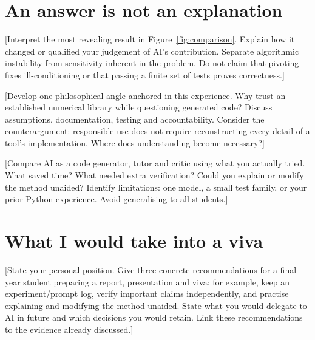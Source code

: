 \documentclass[11pt,a4paper]{article}
\begin{document}
\newpage
\section*{An answer is not an explanation}
[Interpret the most revealing result in Figure~\ref{fig:comparison}.
Explain how it changed or qualified your judgement of AI's contribution.
Separate algorithmic instability from sensitivity inherent in the problem.
Do not claim that pivoting fixes ill-conditioning or that passing a finite
set of tests proves correctness.]

[Develop one philosophical angle anchored in this experience. Why trust an
established numerical library while questioning generated code? Discuss
assumptions, documentation, testing and accountability. Consider the
counterargument: responsible use does not require reconstructing every
detail of a tool's implementation. Where does understanding become necessary?]

[Compare AI as a code generator, tutor and critic using what you actually
tried. What saved time? What needed extra verification? Could you explain or
modify the method unaided? Identify limitations: one model, a small test
family, or your prior Python experience. Avoid generalising to all students.]

\section*{What I would take into a viva}
[State your personal position. Give three concrete recommendations for a
final-year student preparing a report, presentation and viva: for example,
keep an experiment/prompt log, verify important claims independently, and
practise explaining and modifying the method unaided. State what you would
delegate to AI in future and which decisions you would retain. Link these
recommendations to the evidence already discussed.]

\end{document}
